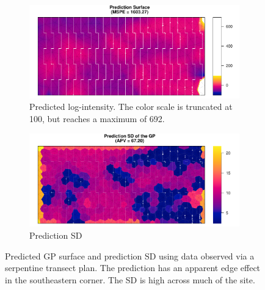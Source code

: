 \documentclass[review]{elsarticle}
\begin{document}
\begin{figure}

\begin{subfigure}{5in}
\includegraphics[width=5in]{../graphics/lambda-Serp000148-LGCP000004.pdf}
\caption{Predicted log-intensity. The color scale is truncated at 100, but
reaches a maximum of 692.}
\label{lambdaserp000148}
\end{subfigure}

\begin{subfigure}{5in}
\includegraphics[width=5in]{../graphics/lambdaSD-Serp000148-LGCP000004.pdf}
\caption{Prediction SD}
\label{sdserp000148}
\end{subfigure}

\caption{Predicted GP surface and prediction SD using data observed via a
serpentine transect plan. The prediction has an apparent edge effect in the
southeastern corner. The SD is high across much of the site.}
\label{serp000148}
\end{figure}
\end{document}

